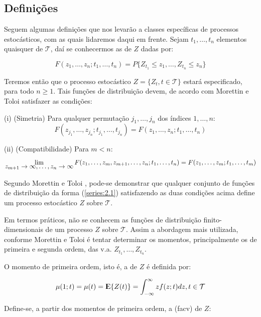 \subsection{Definições}

Seguem algumas definições que nos levarão a classes específicas de processos estocásticos, com as quais lidaremos daqui em frente. Sejam $t_1, \ldots, t_n$ elementos quaisquer de $\mathcal{T}$, daí se conhecermos as  de $Z$ dadas por:

\begin{equation}\label{series:2.1}
F(z_1, \ldots, z_n; t_1, \ldots, t_n) = P\{ Z_{t_1} \leq z_1, \ldots, Z_{t_n} \leq z_n \}
\end{equation}

Teremos então que o processo estocástico $Z = \{ Z_t, t \in \mathcal{T} \}$ estará especificado, para todo $n \geq 1$. Tais funções de distribuição devem, de acordo com Morettin e Toloi \citep{morettin} satisfazer as condições:

	(i) (Simetria) Para qualquer permutação $j_1, \ldots, j_n$ dos índices $1, \dots, n$:
\[ F(z_{j_1}, \ldots, z_{j_n}; t_{j_1}, \ldots, t_{j_n}) = F(z_1, \ldots, z_n; t_1, \ldots, t_n) \]

	(ii) (Compatibilidade) Para $m < n$:
\[ \lim_{\mathlarger{z_{m+1} \to \infty, \ldots, z_n \to \infty}} F(z_1, \ldots, z_m, z_{m+1}, \ldots, z_n; t_1, \ldots, t_n) = F(z_1, \ldots, z_m; t_1, \ldots, t_m) \]

Segundo Morettin e Toloi \citep{morettin}, pode-se demonstrar que qualquer conjunto de funções de distribuição da forma (\ref{series:2.1}) satisfazendo as duas condições acima define um processo estocástico $Z$ sobre $\mathcal{T}$.

Em termos práticos, não se conhecem as funções de distribuição finito-dimensionais de um processo $Z$ sobre $\mathcal{T}$. Assim a abordagem mais utilizada, conforme Morettin e Toloi \citep{morettin} é tentar determinar os momentos, principalmente os de primeira e segunda ordem, das v.a. $Z_{t_1}, \ldots, Z_{t_n}$. 

O momento de primeira ordem, isto é, a  de $Z$ é definida por: 

\begin{equation}\label{series:2.5}
\mu(1; t) = \mu(t) = {\rm I\kern-.3em E}\{Z(t)\} = \int_{-\infty}^{\infty} z f(z;t)dz, t \in \mathcal{T}
\end{equation}

Define-se, a partir dos momentos de primeira ordem, a  (facv) de $Z$:

